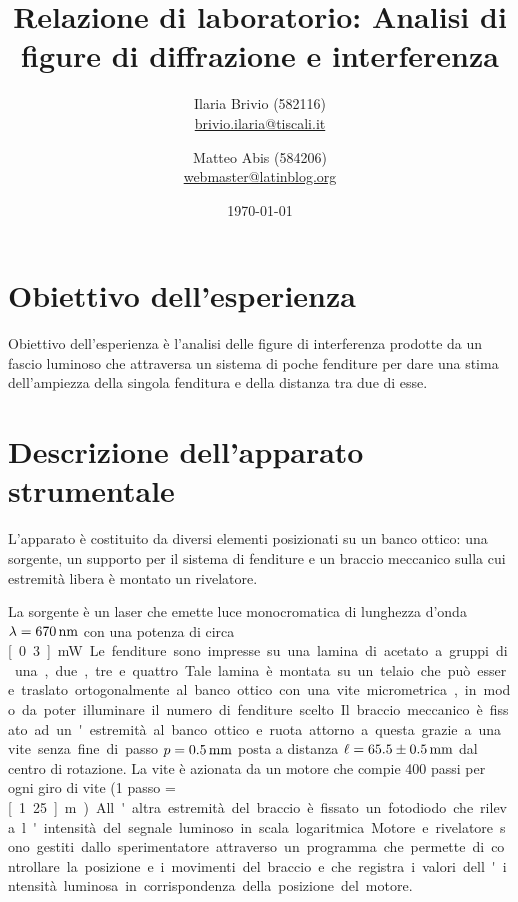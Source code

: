 \documentclass[italian,a4paper]{article}
\begin{document}
\title{Relazione di laboratorio: Analisi di figure di diffrazione e interferenza}
\author{\normalsize Ilaria Brivio (582116)\\
\normalsize \url{brivio.ilaria@tiscali.it}
\and 
\normalsize Matteo Abis (584206)\\ 
\normalsize \url{webmaster@latinblog.org}}
\date{\today}
\maketitle
\section{Obiettivo dell'esperienza}
Obiettivo dell'esperienza è l'analisi delle figure di interferenza prodotte da un fascio luminoso che attraversa un sistema di poche fenditure per dare una stima dell'ampiezza della singola fenditura e della distanza tra due di esse.

\section{Descrizione dell'apparato strumentale}
L'apparato è costituito da diversi elementi posizionati su un banco ottico: una sorgente, un supporto per il sistema di fenditure e un braccio meccanico sulla cui estremità libera è montato un rivelatore.

La sorgente è un laser che emette luce monocromatica di lunghezza d'onda $\lambda=\unit[670]{nm}$ con una potenza di circa \unit[0.3]{mW}. Le fenditure sono impresse su una lamina di acetato a gruppi di una, due, tre e quattro. Tale lamina è montata su un telaio che può essere traslato ortogonalmente al banco ottico con una vite micrometrica, in modo da poter illuminare il numero di fenditure scelto.

Il braccio meccanico è fissato ad un'estremità al banco ottico e ruota attorno a questa grazie a una vite senza fine di passo $p=\unit[0.5]{mm}$ posta a distanza $\ell=\unit[65.5 \pm 0.5]{mm}$ dal centro di rotazione. La vite è azionata da un motore che compie 400 passi per ogni giro di vite (1 passo =\unit[1.25]{\micro m}). All'altra estremità del braccio è fissato un fotodiodo che rileva l'intensità del segnale luminoso in scala logaritmica.

Motore e rivelatore sono gestiti dallo sperimentatore attraverso un programma che permette di controllare la posizione e i movimenti del braccio e che registra i valori dell'intensità luminosa in corrispondenza della posizione del motore.
\end{document}
